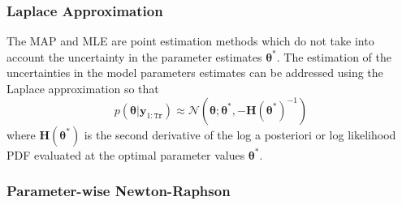 \subsubsection{Laplace Approximation}

The MAP and MLE are point estimation methods which do not take into account the uncertainty in the parameter estimates $\bm\theta^{*}$. 
The estimation of the uncertainties in the model parameters estimates can be addressed using the Laplace approximation \cite{gelman2014bayesian} so that
$$p(\bm\theta|\mathbf{y}_{1:\mathtt{Tr}})  \approx  \mathcal{N}\left(\bm\theta;\bm\theta^{*},-\mathbf{H}(\bm\theta^{*})^{-1}\right)
\label{EQ: LaA}
$$
where $\mathbf{H}(\bm\theta^{*})$ is the second derivative of the log a posteriori or log likelihood PDF evaluated at the optimal parameter values $\bm\theta^{*}$. 

\subsubsection{Parameter-wise Newton-Raphson}

